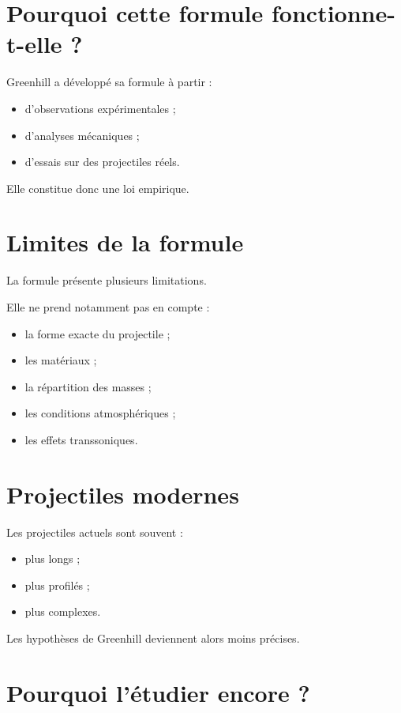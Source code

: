 \section{Pourquoi cette formule fonctionne-t-elle ?}

Greenhill a développé sa formule à partir :

\begin{itemize}
    \item d'observations expérimentales ;
    \item d'analyses mécaniques ;
    \item d'essais sur des projectiles réels.
\end{itemize}

Elle constitue donc une loi empirique.

\section{Limites de la formule}

La formule présente plusieurs limitations.

Elle ne prend notamment pas en compte :

\begin{itemize}
    \item la forme exacte du projectile ;
    \item les matériaux ;
    \item la répartition des masses ;
    \item les conditions atmosphériques ;
    \item les effets transsoniques.
\end{itemize}

\section{Projectiles modernes}

Les projectiles actuels sont souvent :

\begin{itemize}
    \item plus longs ;
    \item plus profilés ;
    \item plus complexes.
\end{itemize}

Les hypothèses de Greenhill deviennent alors moins précises.

\section{Pourquoi l'étudier encore ?}

